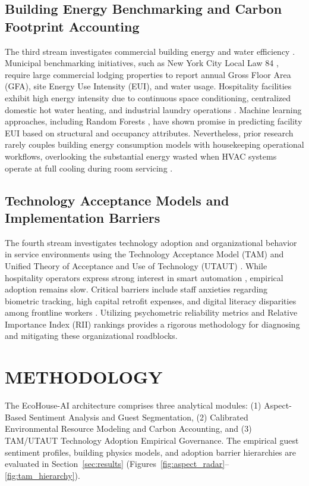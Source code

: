 \documentclass[11pt,a4paper]{article}
\begin{document}
\subsection{Building Energy Benchmarking and Carbon Footprint Accounting}
The third stream investigates commercial building energy and water efficiency \cite{wang2012,bonilla2011}. Municipal benchmarking initiatives, such as New York City Local Law 84 \cite{nycll842023}, require large commercial lodging properties to report annual Gross Floor Area (GFA), site Energy Use Intensity (EUI), and water usage. Hospitality facilities exhibit high energy intensity due to continuous space conditioning, centralized domestic hot water heating, and industrial laundry operations \cite{wang2012}. Machine learning approaches, including Random Forests \cite{breiman2001}, have shown promise in predicting facility EUI based on structural and occupancy attributes. Nevertheless, prior research rarely couples building energy consumption models with housekeeping operational workflows, overlooking the substantial energy wasted when HVAC systems operate at full cooling during room servicing \cite{cornell2023}.

\subsection{Technology Acceptance Models and Implementation Barriers}
The fourth stream investigates technology adoption and organizational behavior in service environments using the Technology Acceptance Model (TAM) \cite{davis1989} and Unified Theory of Acceptance and Use of Technology (UTAUT) \cite{venkatesh2003,venkatesh2012}. While hospitality operators express strong interest in smart automation \cite{ivanov2019,buhalis1998}, empirical adoption remains slow. Critical barriers include staff anxieties regarding biometric tracking, high capital retrofit expenses, and digital literacy disparities among frontline workers \cite{krause2005,khanra2021}. Utilizing psychometric reliability metrics \cite{cronbach1951} and Relative Importance Index (RII) rankings \cite{tam2004} provides a rigorous methodology for diagnosing and mitigating these organizational roadblocks.

\section{METHODOLOGY}

The EcoHouse-AI architecture comprises three analytical modules: (1) Aspect-Based Sentiment Analysis and Guest Segmentation, (2) Calibrated Environmental Resource Modeling and Carbon Accounting, and (3) TAM/UTAUT Technology Adoption Empirical Governance. The empirical guest sentiment profiles, building physics models, and adoption barrier hierarchies are evaluated in Section~\ref{sec:results} (Figures~\ref{fig:aspect_radar}--\ref{fig:tam_hierarchy}).
\end{document}
